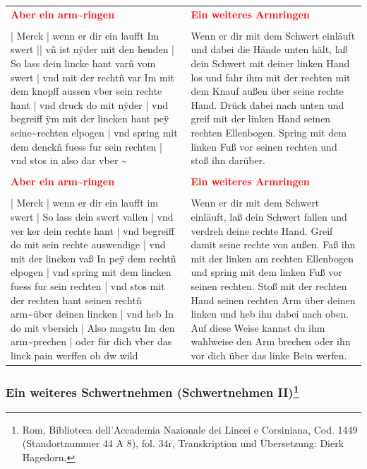 \begin{longtable}{p{6.25cm}p{6.25cm}}
\textbf{\textcolor{red}{Aber ein arm\textasciitilde  ringen}}
&
\textbf{\textcolor{red}{Ein weiteres Armringen}}
\\
\\
| Merck | wenn er dir ein laufft Im swert || vñ ist nÿder mit den henden | So lass dein lincke hant varñ vom swert | vnd mit der rechtñ var Im mit dem knopff aussen vber sein rechte hant | vnd druck do mit nÿder | vnd begreiff ÿm mit der lincken hant peÿ seine\textasciitilde  rechten elpogen | vnd spring mit dem denckñ fuess fur sein rechten | vnd stos in also dar vber \textasciitilde 
&
Wenn er dir mit dem Schwert einläuft und dabei die Hände unten hält, laß dein Schwert mit deiner linken Hand los und fahr ihm mit der rechten mit dem Knauf außen über seine rechte Hand. Drück dabei nach unten und greif mit der linken Hand seinen rechten Ellenbogen. Spring mit dem linken Fuß vor seinen rechten und stoß ihn darüber.
\\
\\
\textbf{\textcolor{red}{Aber ein arm\textasciitilde  ringen}}
&
\textbf{\textcolor{red}{Ein weiteres Armringen}}
\\
\\
| Merck | wenn er dir ein laufft im swert | So lass dein swert vallen | vnd ver ker dein rechte hant | vnd begreiff do mit sein rechte auswendige | vnd mit der lincken vaß In peÿ dem rechtñ elpogen | vnd spring mit dem lincken fuess fur sein rechten | vnd stos mit der rechten hant seinen rechtñ arm\textasciitilde  über deinen lincken | vnd heb In do mit vbersich | Also magstu Im den arm\textasciitilde  prechen | oder für dich vber das linck pain werffen ob dw wild
&
Wenn er dir mit dem Schwert einläuft, laß dein Schwert fallen und verdreh deine rechte Hand. Greif damit seine rechte von außen. Faß ihn mit der linken am rechten Ellenbogen und spring mit dem linken Fuß vor seinen rechten. Stoß mit der rechten Hand seinen rechten Arm über deinen linken und heb ihn dabei nach oben. Auf diese Weise kannst du ihm wahlweise den Arm brechen oder ihn vor dich über das linke Bein werfen.
\end{longtable}

\newpage

\begin{center}
\end{center}
\newpage

\subsubsection[Ein weiteres Schwertnehmen (Schwertnehmen II)]{Ein weiteres Schwertnehmen (Schwertnehmen II)\footnote{\hspace*{0.5ex}Rom, Biblioteca dell'Accademia Nazionale dei Lincei e Corsiniana, Cod. 1449 (Standortnummer 44 A 8), fol. 34r, Transkription und Übersetzung: Dierk Hagedorn.}}


